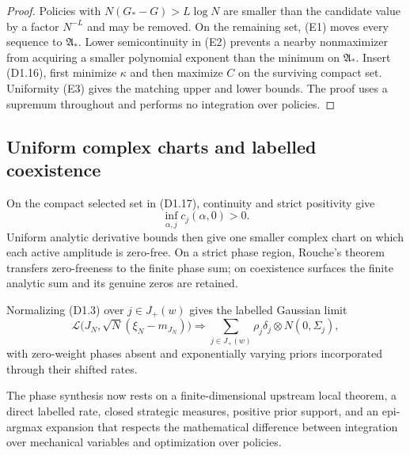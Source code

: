 \begin{proof}
Policies with $N(G_*-G)>L\log N$ are smaller than the candidate value by a
factor $N^{-L}$ and may be removed.  On the remaining set, (E1) moves every
sequence to $\mathfrak A_*$.  Lower semicontinuity in (E2) prevents a nearby
nonmaximizer from acquiring a smaller polynomial exponent than the minimum on
$\mathfrak A_*$.  Insert (D1.16), first minimize $\kappa$ and then maximize
$C$ on the surviving compact set.  Uniformity (E3) gives the matching upper
and lower bounds.  The proof uses a supremum throughout and performs no
integration over policies.
\end{proof}

\subsection{Uniform complex charts and labelled coexistence}

On the compact selected set in (D1.17), continuity and strict positivity give
\[
 \inf_{\alpha,j}c_j(\alpha,0)>0.                           \tag{D1.19}
\]
Uniform analytic derivative bounds then give one smaller complex chart on
which each active amplitude is zero-free.  On a strict phase region, Rouche's
theorem transfers zero-freeness to the finite phase sum; on coexistence
surfaces the finite analytic sum and its genuine zeros are retained.

Normalizing (D1.3) over $j\in J_+(w)$ gives the labelled Gaussian limit
\[
 \mathcal L\bigl(J_N,\sqrt N(\xi_N-m_{J_N})\bigr)
 \Longrightarrow
 \sum_{j\in J_+(w)}\rho_j\delta_j\otimes N(0,\Sigma_j),  \tag{D1.20}
\]
with zero-weight phases absent and exponentially varying priors incorporated
through their shifted rates.

The phase synthesis now rests on a finite-dimensional upstream local theorem,
a direct labelled rate, closed strategic measures, positive prior support,
and an epi-argmax expansion that respects the mathematical difference between
integration over mechanical variables and optimization over policies.
